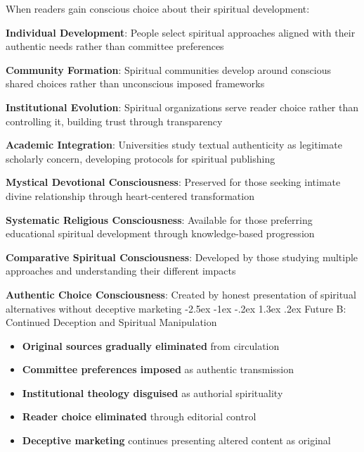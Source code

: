 \documentclass[12pt,twoside]{book}
\makeatletter
\renewcommand\section{\@startsection{section}{1}{\z@}%
{-2.5ex \@plus -1ex \@minus -.2ex}%
{1.3ex \@plus.2ex}%
{\normalfont\Large\bfseries}}
\makeatother
\begin{document}
When readers gain conscious choice about their spiritual development:

\textbf{\textbf{Individual Development}}: People select spiritual approaches aligned with their authentic needs rather than committee preferences

\textbf{\textbf{Community Formation}}: Spiritual communities develop around conscious shared choices rather than unconscious imposed frameworks

\textbf{\textbf{Institutional Evolution}}: Spiritual organizations serve reader choice rather than controlling it, building trust through transparency

\textbf{\textbf{Academic Integration}}: Universities study textual authenticity as legitimate scholarly concern, developing protocols for spiritual publishing

\textbf{\textbf{Mystical Devotional Consciousness}}: Preserved for those seeking intimate divine relationship through heart-centered transformation

\textbf{\textbf{Systematic Religious Consciousness}}: Available for those preferring educational spiritual development through knowledge-based progression

\textbf{\textbf{Comparative Spiritual Consciousness}}: Developed by those studying multiple approaches and understanding their different impacts

\textbf{\textbf{Authentic Choice Consciousness}}: Created by honest presentation of spiritual alternatives without deceptive marketing
\section{Future B: Continued Deception and Spiritual Manipulation}
\label{sec:orgafc2284}

\begin{itemize}
\item \textbf{\textbf{Original sources gradually eliminated}} from circulation
\item \textbf{\textbf{Committee preferences imposed}} as authentic transmission
\item \textbf{\textbf{Institutional theology disguised}} as authorial spirituality
\item \textbf{\textbf{Reader choice eliminated}} through editorial control
\item \textbf{\textbf{Deceptive marketing}} continues presenting altered content as original
\end{itemize}
\end{document}
